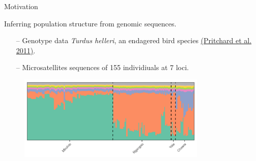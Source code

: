 
\begin{frame}{Motivation}

Inferring population structure from genomic sequences.
\begin{itemize}
  \item[--] Genotype data \textit{Turdus helleri}, an endagered bird species
  {\color{blue} \href{https://web.stanford.edu/group/pritchardlab/publications/pdfs/PritchardEtAl00.pdf}{(Pritchard et al. 2011)}}.
  \item[--] Microsatellites sequences of 155 individiuals at 7 loci.
\end{itemize}


\begin{figure}[!h]
\centering
\includegraphics[width = 0.8\textwidth]{./figures/structure_example.png}
\end{figure}

\end{frame}

